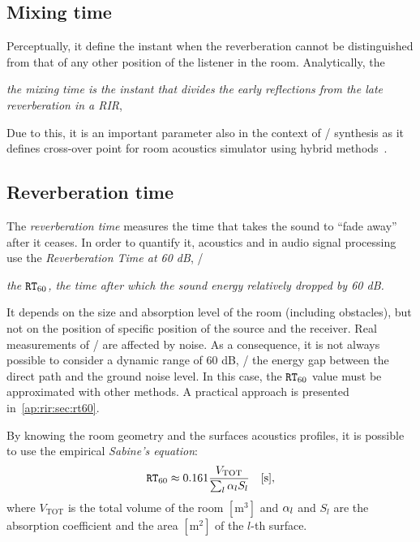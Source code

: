 \subsection{Mixing time}
Perceptually, it define the instant when the reverberation cannot be distinguished from that of any other position of the listener in the room.
Analytically,  the
\begin{center}
    \textit{the mixing time is the instant that divides the early reflections from the late reverberation in a RIR},
\end{center}
Due to this, it is an important parameter also in the context of \RIRs/ synthesis as it defines cross-over point for room acoustics simulator using hybrid methods~.

\subsection{Reverberation time}
The \textit{reverberation time} measures the time that takes the sound to ``fade away'' after it ceases.
In order to quantify it, acoustics and in audio signal processing use the \textit{Reverberation Time at 60 dB}, \ie/
\begin{center}
    \textit{the $\mathtt{RT}_{60}$, the time after which the sound energy relatively dropped by 60 dB.}
\end{center}
It depends on the size and absorption level of the room (including obstacles), but not on the position of specific position of the source and the receiver.
Real measurements of \RIRs/ are affected by noise.
As a consequence, it is not always possible to consider a dynamic range of 60 dB,
\ie/ the energy gap between the direct path and the ground noise level.
In this case, the $\mathtt{RT}_{60}$ value must be approximated with other methods.
A practical approach is presented in~\cref{ap:rir:sec:rt60}.

By knowing the room geometry and the surfaces acoustics profiles,
it is possible to use the empirical \textit{Sabine's equation}:
\begin{equation}
    \mathtt{RT}_{60}
    \approx 0.161 \frac{V_{\text{TOT}}}{\sum_l \alpha_l S_l} \hspace{1em} [\si{\second}]
    ,
\end{equation}
where $V_{\text{TOT}}$ is the total volume of the room $[\si{\metre^3}]$ and $\alpha_l$ and $S_l$ are the
absorption coefficient and the area $[\si{\metre^2}]$  of the $l$-th surface.

